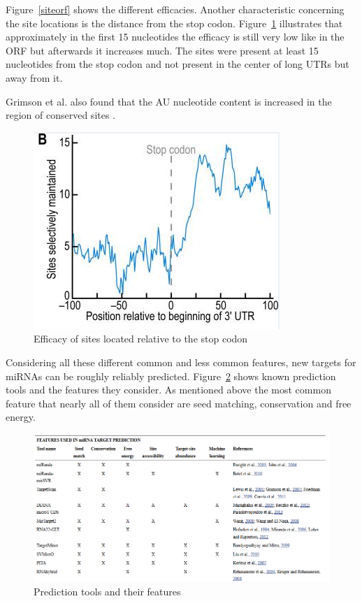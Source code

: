 \documentclass[12pt]{article}
\begin{document}
Figure~\ref{siteorf} shows the different efficacies. Another characteristic concerning the site locations is the distance from the stop codon. Figure~\ref{sitestop} illustrates that approximately in the first 15 nucleotides the efficacy is still very low like in the ORF but afterwards it increases much. 
The sites were present at least 15 nucleotides from the stop codon and not present in the center of long UTRs but away from it. 

Grimson et al. also found that the AU nucleotide content is increased in the region of conserved sites \cite{Grimson}.

\begin{figure}
\centering
\includegraphics[scale=0.6]{results/site_stop.PNG} 
\caption{Efficacy of sites located relative to the stop codon}
\label{sitestop}
\end{figure}

   
Considering all these different common and less common features, new targets for miRNAs can be roughly reliably predicted. Figure~\ref{fig:tools} shows known prediction tools and the features they consider. As mentioned above the most common feature that nearly all of them consider are seed matching, conservation and free energy. 


\begin{figure}
\centering
\includegraphics[scale=0.5]{results/tools.PNG}
\caption{Prediction tools and their features}
\label{fig:tools}
\end{figure}
\end{document}

